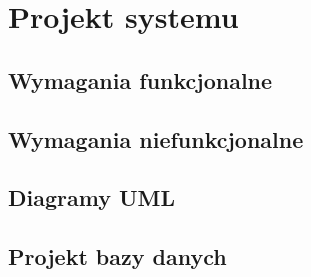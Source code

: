 \section{Projekt systemu}
\subsection{Wymagania funkcjonalne}
\subsection{Wymagania niefunkcjonalne}
\subsection{Diagramy UML}
\subsection{Projekt bazy danych}
